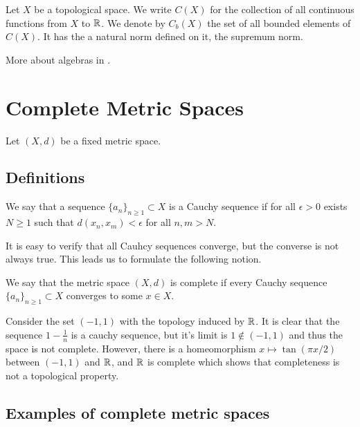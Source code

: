 \documentclass[11pt,a4paper]{article}
\begin{document}
\begin{definition}
  Let $X$ be a topological space. We write $C(X)$ for the collection of 
  all continuous functions from $X$ to $\mathbb{R}$. We denote by $C_b(X)$ the set 
  of all bounded elements of $C(X)$. It has the a natural norm defined on
  it, the supremum norm.
\end{definition}

More about algebras in .

\newpage

\section{Complete Metric Spaces}\label{sec:complete-metric-spaces}
Let $(X,d)$ be a fixed metric space.

\subsection{Definitions}

\begin{definition}
  We say that a sequence $\{a_n\}_{n \geq 1} \subset X$ is a Cauchy
  sequence if for all $\epsilon > 0$ exists $N \geq 1$ such that 
  $d(x_n,x_m) < \epsilon$ for all $n,m > N$.
\end{definition}

It is easy to verify that all Cauhcy sequences converge, but the converse
is not always true. This leads us to formulate the following notion.

\begin{definition}
  We say that the metric space $(X,d)$ is complete if every Cauchy
  sequence $\{a_n\}_{n \geq 1} \subset X$ converges to some $x \in X$.
\end{definition}

\begin{remark}
  Consider the set $(-1,1)$ with the topology induced by $\mathbb{R}$. It is
  clear that the sequence $1 - \frac{1}{n}$ is a cauchy sequence, but
  it's limit is $1 \notin (-1,1)$ and thus the space is not complete.
  However, there is a homeomorphism $x \mapsto \tan(\pi x/2)$ between
  $(-1,1)$ and $\mathbb{R}$, and $\mathbb{R}$ is complete which shows that completeness
  is not a topological property.
\end{remark}

\subsection{Examples of complete metric spaces}
\end{document}

